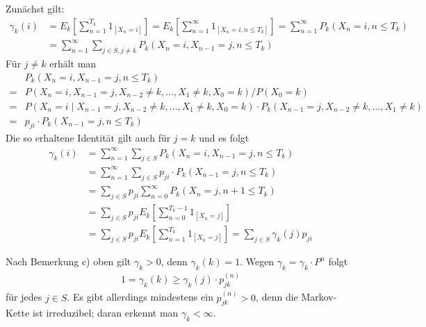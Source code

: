 \documentclass[a4paper,twoside,DIV15,BCOR12mm]{scrbook}
\begin{document}
\begin{beweis}
\begin{enuma}
\item Zunächst gilt:
  \begin{align*}
      \gamma_k(i)
    &= E_k[\sum_{n=1}^{T_k} 1_{[X_n = i]}]
     = E_k[\sum_{n=1}^\infty 1_{[X_n = i, n \leq T_k]}]
     = \sum_{n=1}^\infty P_k(X_n = i, n \leq T_k)\\
    &= \sum_{n=1}^\infty \sum_{j \in S,j\neq k} P_k(X_n = i, X_{n-1} = j, n \leq T_k)
  \end{align*}
  Für $j \neq k$ erhält man
  \begin{align*}
      &P_k(X_n = i, X_{n-1} = j, n \leq T_k)\\
    = &P(X_n = i, X_{n-1} = j, X_{n-2} \neq k, \ldots, X_1 \neq k, X_0 = k) / P(X_0 = k)\\
    = &P(X_n = i \mid X_{n-1} = j, X_{n-2} \neq k, \ldots, X_1 \neq k, X_0 = k) \cdot P_k(X_{n-1} = j, X_{n-2} \neq k, \ldots, X_1 \neq k)\\
    = &p_{ji} \cdot P_k(X_{n-1} = j, n \leq T_k)
  \end{align*}
  Die so erhaltene Identität gilt auch für $j = k$ und es folgt
  \begin{align*}
    \gamma_k(i) &= \sum_{n=1}^\infty \sum_{j \in S} P_k(X_n = i, X_{n-1} = j, n \leq T_k)\\
                &= \sum_{n=1}^\infty \sum_{j \in S} p_{ji} \cdot P_k(X_{n-1} = j, n \leq T_k)\\
                &= \sum_{j \in S} p_{ji} \sum_{n=0}^\infty P_k(X_n = j, n+1 \leq T_k)\\
                &= \sum_{j \in S} p_{ji} E_k[\sum_{n=0}^{T_k-1} 1_{[X_n = j]}]\\
                &= \sum_{j \in S} p_{ji} E_k[\sum_{n=1}^{T_k} 1_{[X_n = j]}]
                 = \sum_{j \in S} \gamma_k(j) p_{ji}
  \end{align*}

\item
  Nach Bemerkung c) oben gilt $\gamma_k > 0$, denn $\gamma_k(k) = 1$. Wegen $\gamma_k = \gamma_k \cdot P^n$ folgt
  \begin{align*}
    1 = \gamma_k(k) \geq \gamma_k(j) \cdot p_{jk}^{(n)}
  \end{align*}
  für jedes $j \in S$. Es gibt allerdings mindestens ein $p_{jk}^{(n)} > 0$, denn die Markov-Kette ist irreduzibel; daran erkennt man
  $\gamma_k < \infty$.


\end{enuma}
\end{beweis}
\end{document}
